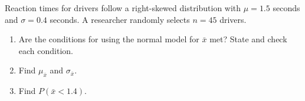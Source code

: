 \documentclass[10pt]{article}
\begin{document}
\namedateperiod

\vspace{0.15in}

Reaction times for drivers follow a right-skewed distribution with $\mu = 1.5$ seconds
and $\sigma = 0.4$ seconds. A researcher randomly selects $n = 45$ drivers.

\begin{enumerate}
  \item Are the conditions for using the normal model for $\bar{x}$ met? State and check
        each condition.

  \item Find $\mu_{\bar{x}}$ and $\sigma_{\bar{x}}$.
        \vspace{0.6in}

  \item Find $P(\bar{x} < 1.4)$.
        \vspace{0.8in}
\end{enumerate}
\end{document}
